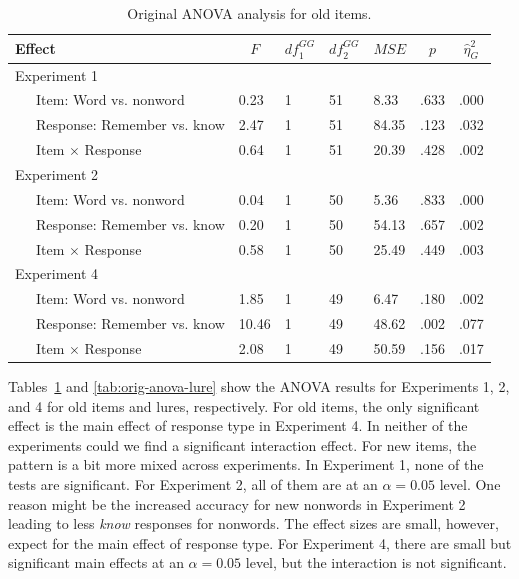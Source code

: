 \documentclass[english,,man,floatsintext]{apa6}
\begin{document}
\begin{table}[tbp]

\begin{center}
\begin{threeparttable}

\caption{\label{tab:orig-analysis}Original ANOVA analysis for old items.}

\begin{tabular}{lllllll}
\toprule
Effect & \multicolumn{1}{c}{$F$} & \multicolumn{1}{c}{$\mathit{df}_1^{GG}$} & \multicolumn{1}{c}{$\mathit{df}_2^{GG}$} & \multicolumn{1}{c}{$\mathit{MSE}$} & \multicolumn{1}{c}{$p$} & \multicolumn{1}{c}{$\hat{\eta}^2_G$}\\
\midrule
Experiment 1 &  &  &  &  &  & \\
\ \ \ Item: Word vs. nonword & 0.23 & 1 & 51 & 8.33 & .633 & .000\\
\ \ \ Response: Remember vs. know & 2.47 & 1 & 51 & 84.35 & .123 & .032\\
\ \ \ Item $\times$ Response & 0.64 & 1 & 51 & 20.39 & .428 & .002\\
Experiment 2 &  &  &  &  &  & \\
\ \ \ Item: Word vs. nonword & 0.04 & 1 & 50 & 5.36 & .833 & .000\\
\ \ \ Response: Remember vs. know & 0.20 & 1 & 50 & 54.13 & .657 & .002\\
\ \ \ Item $\times$ Response & 0.58 & 1 & 50 & 25.49 & .449 & .003\\
Experiment 4 &  &  &  &  &  & \\
\ \ \ Item: Word vs. nonword & 1.85 & 1 & 49 & 6.47 & .180 & .002\\
\ \ \ Response: Remember vs. know & 10.46 & 1 & 49 & 48.62 & .002 & .077\\
\ \ \ Item $\times$ Response & 2.08 & 1 & 49 & 50.59 & .156 & .017\\
\bottomrule
\end{tabular}

\end{threeparttable}
\end{center}

\end{table}

Tables~\ref{tab:orig-analysis} and \ref{tab:orig-anova-lure} show the ANOVA results for Experiments 1, 2, and 4 for old items and lures, respectively. For old items, the only significant effect is the main effect of response type in Experiment 4. In neither of the experiments could we find a significant interaction effect. For new items, the pattern is a bit more mixed across experiments. In Experiment 1, none of the tests are significant. For Experiment 2, all of them are at an \(\alpha = 0.05\) level. One reason might be the increased accuracy for new nonwords in Experiment 2 leading to less \emph{know} responses for nonwords. The effect sizes are small, however, expect for the main effect of response type. For Experiment 4, there are small but significant main effects at an \(\alpha = 0.05\) level, but the interaction is not significant.
\end{document}
